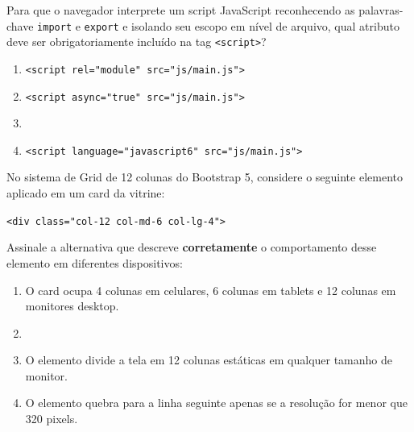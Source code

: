 \begin{tcolorbox}[colback=white, colframe=azulTitulo, title=\textbf{Questão 4: Declaração de Módulos no HTML5}]
    Para que o navegador interprete um script JavaScript reconhecendo as palavras-chave \texttt{import} e \texttt{export} e isolando seu escopo em nível de arquivo, qual atributo deve ser obrigatoriamente incluído na tag \texttt{<script>}?
    \begin{enumerate}[label=\alph*)]
        \item \texttt{<script rel="module" src="js/main.js">}
        \item \texttt{<script async="true" src="js/main.js">}
        \item {}
        \item \texttt{<script language="javascript6" src="js/main.js">}
    \end{enumerate}
\end{tcolorbox}

\begin{tcolorbox}[colback=white, colframe=azulTitulo, title=\textbf{Questão 5: Sistema de Grid e Responsividade do Bootstrap 5}]
    No sistema de Grid de 12 colunas do Bootstrap 5, considere o seguinte elemento aplicado em um card da vitrine:\\
    \centerline{\texttt{<div class="col-12 col-md-6 col-lg-4">}}
    Assinale a alternativa que descreve \textbf{corretamente} o comportamento desse elemento em diferentes dispositivos:
    \begin{enumerate}[label=\alph*)]
        \item O card ocupa 4 colunas em celulares, 6 colunas em tablets e 12 colunas em monitores desktop.
        \item {}
        \item O elemento divide a tela em 12 colunas estáticas em qualquer tamanho de monitor.
        \item O elemento quebra para a linha seguinte apenas se a resolução for menor que 320 pixels.
    \end{enumerate}
\end{tcolorbox}

